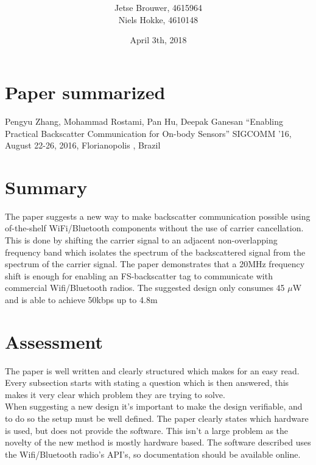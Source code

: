 \documentclass [a4,twoside,11pt] {article}
\begin{document}
\title{
}
\author{Jetse Brouwer, 4615964 \\ Niels Hokke, 4610148}
\date{April 3th, 2018}
\maketitle

\setcounter{secnumdepth}{1}


\section{Paper summarized}
Pengyu Zhang, Mohammad Rostami, Pan Hu, Deepak Ganesan ``Enabling Practical Backscatter Communication for On-body Sensors'' SIGCOMM ’16, August 22-26, 2016, Florianopolis , Brazil


\section{Summary}
The paper suggests a new way to make backscatter communication possible using of-the-shelf WiFi/Bluetooth components without the use of carrier cancellation. This is done by shifting the carrier signal to an adjacent non-overlapping frequency band which isolates the spectrum of the backscattered signal from the spectrum of the carrier signal. The paper demonstrates that a 20MHz frequency shift is enough for enabling an FS-backscatter tag to communicate with commercial Wifi/Bluetooth radios. The suggested design only consumes 45 $\mu$W and is able to achieve 50kbps up to 4.8m


\section{Assessment}
The paper is well written and clearly structured which makes for an easy read. Every subsection starts with stating a question which is then answered, this makes it very clear which problem they are trying to solve. 
\\
When suggesting a new design it's important to make the design verifiable, and to do so the setup must be well defined. The paper clearly states which hardware is used, but does not provide the software. This isn't a large problem as the novelty of the new method is mostly hardware based. The software described uses the Wifi/Bluetooth radio's API's, so documentation should be available online.
\end{document}

